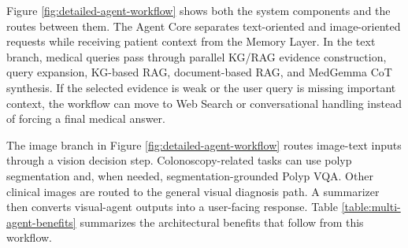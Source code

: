 Figure \ref{fig:detailed-agent-workflow} shows both the system components and the routes between them. The Agent Core separates text-oriented and image-oriented requests while receiving patient context from the Memory Layer. In the text branch, medical queries pass through parallel KG/RAG evidence construction, query expansion, KG-based RAG, document-based RAG, and MedGemma CoT synthesis. If the selected evidence is weak or the user query is missing important context, the workflow can move to Web Search or conversational handling instead of forcing a final medical answer.

The image branch in Figure \ref{fig:detailed-agent-workflow} routes image-text inputs through a vision decision step. Colonoscopy-related tasks can use polyp segmentation and, when needed, segmentation-grounded Polyp VQA. Other clinical images are routed to the general visual diagnosis path. A summarizer then converts visual-agent outputs into a user-facing response. Table \ref{table:multi-agent-benefits} summarizes the architectural benefits that follow from this workflow.

